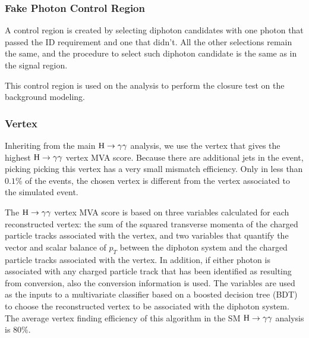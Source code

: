 



\subsubsection{Fake Photon Control Region}\label{sec:PCR}
A control region is created by selecting diphoton candidates with one photon that passed the ID requirement and one that didn't. All the other selections remain the same, and the procedure to select such diphoton candidate is the same as in the signal region.

This control region is used on the analysis to perform the closure test on the background modeling.

\subsubsection{Vertex}
Inheriting from the main $\mathrm{H}\to\gamma\gamma$ analysis, we use the vertex that gives the highest $\mathrm{H}\to\gamma\gamma$ vertex MVA score. 
Because there are additional jets in the event, picking picking this vertex has a very small mismatch efficiency. 
Only in less than $0.1\%$ of the events, the chosen vertex is different from the vertex associated to the simulated event. 

The $\mathrm{H}\to\gamma\gamma$ vertex MVA score is based on three variables calculated for each reconstructed vertex: the sum of the squared transverse momenta of the charged particle tracks associated with the vertex, and two variables that quantify the vector and scalar balance of $p_{T}$ between the diphoton system and the charged particle tracks associated with the vertex. 
In addition, if either photon is associated with any charged particle track that has been identified as resulting from conversion, also the conversion information is used. 
The variables are used as the inputs to a multivariate classifier based on a boosted decision tree (BDT) to choose the reconstructed vertex to be associated with the diphoton system. 
The average vertex finding efficiency of this algorithm in the SM $\mathrm{H}\to\gamma\gamma$ analysis is $80\%$.

